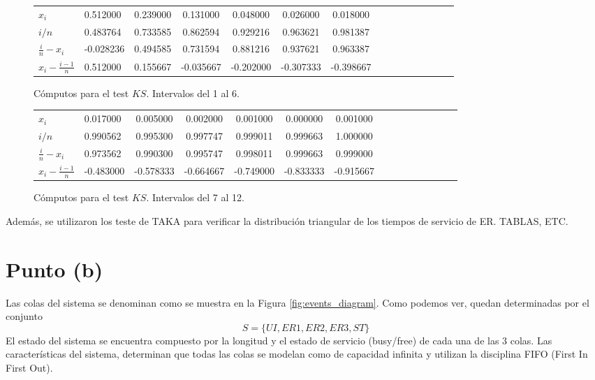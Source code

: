 \documentclass[a4paper,10pt]{article}
\begin{document}
\begin{figure}[ht]
\begin{center}
\begin{tabular}{l|l*{12}{c}r}
\hline
$x_i$&0.512000&0.239000&0.131000&0.048000&0.026000&0.018000\\
$i/n$&0.483764&0.733585&0.862594&0.929216&0.963621&0.981387\\
$\frac{i}{n} - x_i$&-0.028236&0.494585&0.731594&0.881216&0.937621&0.963387\\
$x_i - \frac{i-1}{n}$&0.512000&0.155667&-0.035667&-0.202000&-0.307333&-0.398667\\
\hline
\end{tabular}
\caption{\label{tab:ks_table_first} Cómputos para el test $KS$. Intervalos del 1 al 6.}
\end{center}
\end{figure}

\begin{figure}[ht]
\begin{center}
\begin{tabular}{l|l*{12}{c}r}
\hline
$x_i$&0.017000&0.005000&0.002000&0.001000&0.000000&0.001000\\
$i/n$&0.990562&0.995300&0.997747&0.999011&0.999663&1.000000\\
$\frac{i}{n} - x_i$&0.973562&0.990300&0.995747&0.998011&0.999663&0.999000\\
$x_i - \frac{i-1}{n}$&-0.483000&-0.578333&-0.664667&-0.749000&-0.833333&-0.915667\\
\hline
\end{tabular}
\caption{\label{tab:ks_table_second} Cómputos para el test $KS$. Intervalos del 7 al 12.}
\end{center}
\end{figure}

Además, se utilizaron los teste de TAKA para verificar la distribución triangular de los tiempos de servicio de ER. TABLAS, ETC.

\section{Punto (b)}
Las colas del sistema se denominan como se muestra en la Figura \ref{fig:events_diagram}. Como podemos ver, quedan
determinadas por el conjunto 
\[
S = \{UI, ER1, ER2, ER3, ST\}
\]
El estado del sistema se encuentra compuesto por la longitud y el estado de servicio (busy/free) de cada una de las 3 colas. Las características del sistema, determinan que todas las colas se modelan como de capacidad infinita y utilizan la disciplina FIFO (First In First Out).
\end{document}
